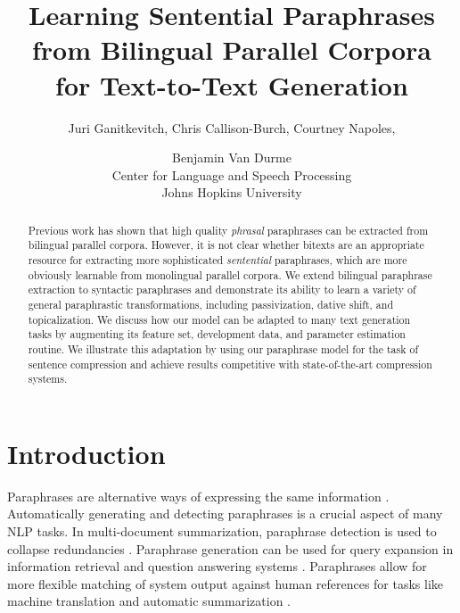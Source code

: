 \documentclass[11pt]{article}
\title{Learning Sentential Paraphrases from Bilingual Parallel Corpora
  \\ for Text-to-Text Generation}
\author{Juri Ganitkevitch, Chris Callison-Burch, Courtney
   Napoles, \and Benjamin Van Durme\\
   Center for Language and Speech Processing\\
   Johns Hopkins University}
\date{}
\begin{document}
\maketitle

\begin{abstract}
  Previous work has shown that high quality {\it phrasal} paraphrases
  can be extracted from bilingual parallel corpora.  However, it is
  not clear whether bitexts are an appropriate resource for extracting
  more sophisticated {\it sentential} paraphrases, which are more
  obviously learnable from monolingual parallel corpora.  We extend
  bilingual paraphrase extraction to syntactic paraphrases and
  demonstrate its ability to learn a variety of general paraphrastic
  transformations, including passivization, dative shift,
  and topicalization.  We discuss how our model can be adapted to
  many text generation tasks by augmenting its feature set,
  development data, and parameter estimation routine.  We illustrate
  this adaptation by using our paraphrase model for the task of
  sentence compression and achieve results competitive with
  state-of-the-art compression systems.
\end{abstract}

\section{Introduction} \label{introduction}

Paraphrases are alternative ways of expressing the same information
\cite{Culicover1968}.  Automatically generating and detecting
paraphrases is a crucial aspect of many NLP tasks.  In multi-document
summarization, paraphrase detection is used to collapse redundancies
\cite{Barzilay1999,BarzilayThesis}. Paraphrase generation can be used
for query expansion in information retrieval and question answering
systems
\cite{mckeown:1979:ACL,Anick1999,Ravichandran2002,Riezler2007}.
Paraphrases allow for more flexible matching of system output
against human references for tasks like machine translation and
automatic summarization
\cite{Zhou2006b,Kauchak2006,Madnani2007,Snover2010}.\nocite{Owczarzak2006}
\end{document}
